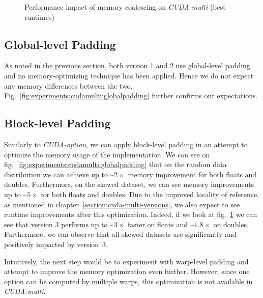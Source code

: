 \begin{figure}[H]
\begin{subfigure}{.49\textwidth}
\end{subfigure}
\begin{center}
  \small
\end{center}
\begin{center}
  \small
\end{center}
\caption{Performance impact of memory coalescing on \textit{CUDA-multi} (best runtimes)}
\label{fig:experiments:cudamulti:coalescing}
\end{figure}

\newpage
\subsection{Global-level Padding}
As noted in the previous section, both version 1 and 2 use global-level padding and no memory-optimizing technique has been applied. Hence we do not expect any memory differences between the two. Fig.~\ref{fig:experiments:cudamulti:globalpadding} further confirms our expectations.

\subsection{Block-level Padding}
Similarly to \textit{CUDA-option}, we can apply block-level padding in an attempt to optimize the memory usage of the implementation. We can see on fig.~\ref{fig:experiments:cudamulti:globalpadding} that on the random data distribution we can achieve up to  \textasciitilde$2\times$ memory improvement for both floats and doubles. Furthermore, on the skewed dataset, we can see memory improvements up to \textasciitilde$5\times$ for both floats and doubles. Due to the improved locality of reference, as mentioned in chapter~\ref{section:cuda-multi-versions}, we also expect to see runtime improvements after this optimization. Indeed, if we look at fig.~\ref{fig:experiments:cudamulti:coalescing} we can see that version 3 performs up to \textasciitilde$3\times$ faster on floats and \textasciitilde$1.8\times$ on doubles. Furthermore, we can observe that all skewed datasets are significantly and positively impacted by version~3. 

Intuitively, the next step would be to experiment with warp-level padding and attempt to improve the memory optimization even further. However, since one option can be computed by multiple warps, this optimization is not available in \textit{CUDA-multi}.

